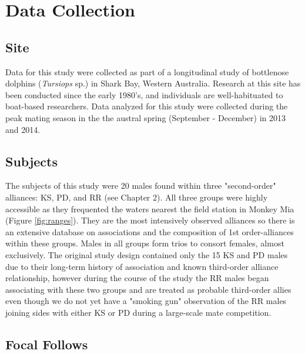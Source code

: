 \documentclass[11pt]{amsart}
\begin{document}

\section{Data Collection}

\subsection{Site}
Data for this study were collected as part of a longitudinal study of bottlenose dolphins (\textit{Tursiops} sp.) in Shark Bay, Western Australia. Research at this site has been conducted since the early 1980's, and individuals are well-habituated to boat-based researchers. Data analyzed for this study were collected during the peak mating season in the the austral spring (September - December) in 2013 and 2014. 

\subsection{Subjects}
The subjects of this study were 20 males found within three "second-order" alliances: KS, PD, and RR (see Chapter 2).  All three groups were highly accessible as they frequented the waters nearest the field station in Monkey Mia (Figure \ref{fig:ranges}). They are the most intensively observed alliances so there is an extensive database on associations and the composition of 1st order-alliances within these groups. Males in all groups form trios to consort females, almost exclusively. The original study design contained only the 15 KS and PD males due to their long-term history of association and known third-order alliance relationship, however during the course of the study the RR males began associating with these two groups and are treated as probable third-order allies even though we do not yet have a "smoking gun" observation of the RR males joining sides with either KS or PD during a large-scale mate competition. 

\subsection{Focal Follows}
\end{document}
